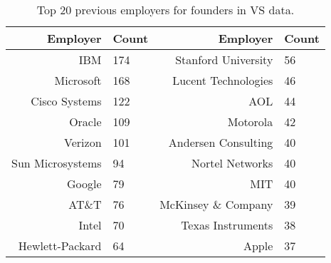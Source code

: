 \begin{table}[]
\centering
\begingroup\normalsize
\caption{Top 20 previous employers for founders in VS data.} 
\label{table:VS_previousEmployersNoPositionsSummaryTable}
\begin{tabular}{rlrl}
  \toprule
Employer & Count & Employer & Count \\ 
  \midrule
IBM & 174 & Stanford University & 56 \\ 
  Microsoft & 168 & Lucent Technologies & 46 \\ 
  Cisco Systems & 122 & AOL & 44 \\ 
  Oracle & 109 & Motorola & 42 \\ 
  Verizon & 101 & Andersen Consulting & 40 \\ 
  Sun Microsystems & 94 & Nortel Networks & 40 \\ 
  Google & 79 & MIT & 40 \\ 
  AT\&T & 76 & McKinsey \& Company & 39 \\ 
  Intel & 70 & Texas Instruments & 38 \\ 
  Hewlett-Packard & 64 & Apple & 37 \\ 
   \bottomrule
\end{tabular}
\endgroup

\end{table}
